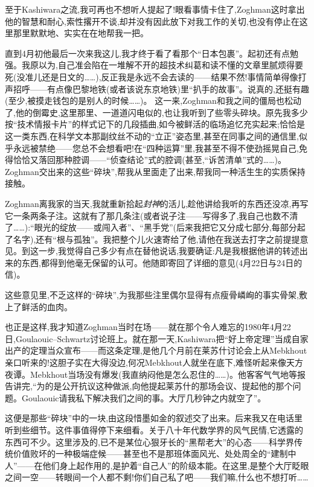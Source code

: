 至于Kashiwara之流,我可再也不想听人提起了!眼看事情卡住了,Zoghman这时拿出他的智慧和耐心,索性撂开不谈,却并没有因此放下对我工作的关切,也没有停止在这里那里默默地、实实在在地帮我一把。

直到4月初他最后一次来我这儿,我才终于看了看那个“日本包裹”。起初还有点勉强。我原以为,自己准会陷在一堆解不开的超技术纠葛和读不懂的文章里腻烦得要死(没准儿还是日文的……),反正我是永远不会去读的——结果不然!事情简单得像打声招呼——有点像巴黎地铁(或者该说东京地铁)里“扒手的故事”。说真的,还挺有趣(至少,被摸走钱包的是别人的时候……)。
这一来,Zoghman和我之间的僵局也松动了,他的倒霉史,这里那里、一道道闪电似的,也让我听到了些零头碎块。原先我多少按“技术情报卡片”的样式记下的几段插曲,如今被鲜活的临场追忆充实起来;恰恰是这一类东西,在科学文本那副纹丝不动的“立正”姿态里,甚至在同事之间的通信里,似乎永远被禁绝——您总不会想看吧!在“四种运算”里,我甚至不得不使劲摇晃自己,免得恰恰又落回那种腔调——“侦查结论”式的腔调(甚至,“诉苦清单”式的……)。Zoghman交出来的这些“碎块”,帮我从里面走了出来,帮我同一种活生生的实质保持接触。

Zoghman离我家的当天,我就重新拾起\emph{封神}的活儿,趁他讲给我听的东西还没凉,再写它一条两条子注。这就有了那几条注(或者说子注——写得多了,我自己也数不清了……):“眼光的绽放——或闯入者”、“黑手党”(后来我把它又分成七部分,每部分起了名字),还有“根与孤独”。我把整个儿火速寄给了他,请他在我送去打字之前提提意见。到这一步,我觉得自己多少有点在替他说话,我要确证:凡是我根据他讲的转述出来的东西,都得到他毫无保留的认可。他随即寄回了详细的意见(4月22日与24日的信)。

\pmark{}这些意见里,不乏这样的“碎块”,为我那些注里偶尔显得有点瘦骨嶙峋的事实骨架,敷上了鲜活的血肉。

也正是这样,我才知道Zoghman当时在场——就在那个令人难忘的1980年4月22日,Goulaouic--Schwartz讨论班上。就在那一天,Kashiwara把“好上帝定理”当成自家出产的定理当众宣布——而这条定理,是他几个月前在莱苏什讨论会上从Mebkhout亲口听来的!这胆子实在大得没边,何况Mebkhout人就坐在底下,难怪听起来像天方夜谭。Mebkhout当场没有爆发(我直纳闷他是怎么忍住的……)。他客客气气地等报告讲完,“为的是公开抗议这种做派,向他提起莱苏什的那场会议、提起他的那个问题。Goulaouic请我私下解决我们之间的事。大厅几秒钟之内就空了”。

这便是那些“碎块”中的一块,由这段惜墨如金的叙述交了出来。后来我又在电话里听到些细节。这件事值得停下来细看。关于八十年代数学界的风气民情,它透露的东西可不少。这里涉及的,已不是某位心狠牙长的“黑帮老大”的心态——科学界传统价值败坏的一种极端症候——甚至也不是那班体面风光、处处周全的“建制中人”——在他们身上起作用的,是护着“自己人”的阶级本能。在这里,是整个大厅眨眼之间一空——转眼间一个人都不剩!你们自己私了吧——我们嘛,什么也不想打听……

